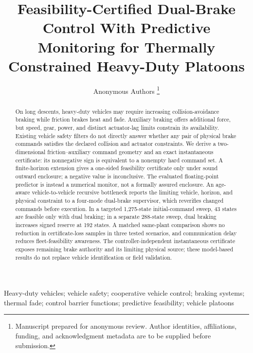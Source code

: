 \documentclass[journal]{../template/IEEEtran}
\title{Feasibility-Certified Dual-Brake Control With Predictive Monitoring for Thermally Constrained Heavy-Duty Platoons}
\author{Anonymous Authors%
\thanks{Manuscript prepared for anonymous review. Author identities, affiliations, funding, and acknowledgment metadata are to be supplied before submission.}}
\begin{document}
\maketitle

\begin{abstract}
On long descents, heavy-duty vehicles may require increasing collision-avoidance braking while friction brakes heat and fade. Auxiliary braking offers additional force, but speed, gear, power, and distinct actuator-lag limits constrain its availability. Existing vehicle safety filters do not directly answer whether any pair of physical brake commands satisfies the declared collision and actuator constraints. We derive a two-dimensional friction--auxiliary command geometry and an exact instantaneous certificate: its nonnegative sign is equivalent to a nonempty hard command set. A finite-horizon extension gives a one-sided feasibility certificate only under sound outward enclosure; a negative value is inconclusive. The evaluated floating-point predictor is instead a numerical monitor, not a formally assured enclosure. An age-aware vehicle-to-vehicle recursive bottleneck reports the limiting vehicle, horizon, and physical constraint to a four-mode dual-brake supervisor, which reverifies changed commands before execution. In a targeted 1,275-state initial-command sweep, 43 states are feasible only with dual braking; in a separate 288-state sweep, dual braking increases signed reserve at 192 states. A matched same-plant comparison shows no reduction in certificate-loss samples in three tested scenarios, and communication delay reduces fleet-feasibility awareness. The controller-independent instantaneous certificate exposes remaining brake authority and its limiting physical source; these model-based results do not replace vehicle identification or field validation.
\end{abstract}

\begin{IEEEkeywords}
Heavy-duty vehicles; vehicle safety; cooperative vehicle control; braking systems; thermal fade; control barrier functions; predictive feasibility; vehicle platoons
\end{IEEEkeywords}














\end{document}
